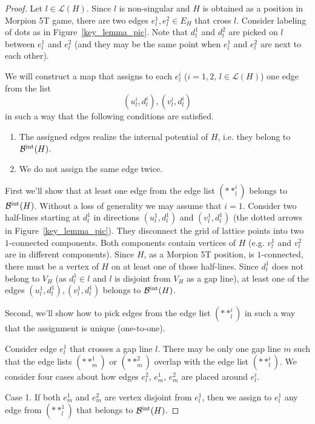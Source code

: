 \begin{proof}
Let $l \in \mathcal{L}(H)$. Since $l$ is non-singular and $H$ is obtained as a position in Morpion 5T game, there are two edges $e^1_l, e^2_l \in E_H$ that cross $l$. 
Consider labeling of dots as in Figure~\ref{key_lemma_pic}. Note that $d^1_l$ and $d^2_l$ are picked on $l$ between $e^1_l$ and $e^2_l$ (and they may be the same point when $e^1_l$ and $e^2_l$ are next to each other).


We will construct a map that assigns to each $e^i_l$ ($i = 1,2$, $l \in \mathcal{L}(H)$) one edge from the list
\[
  (u^i_l, d^i_l), (v^i_l, d^i_l) \tag{$**^i_l$}
\]
in such a way that the following conditions are satisfied.
\begin{enumerate}
\item The assigned edges realize the internal potential of $H$, i.e. they belong to $\mathcal{B}^{\operatorname{int}}(H)$.
\item We do not assign the same edge twice.
\end{enumerate}

First we'll show that at least one edge from the edge list $(**^i_l)$ belongs to $\mathcal{B}^{\operatorname{int}}(H)$.
Without a loss of generality we may assume that $i = 1$.
Consider two half-lines starting at $d^1_l$ in directions $(u^1_l, d^1_l)$ and $(v^1_l, d^1_l)$ (the dotted arrows in Figure~\ref{key_lemma_pic}). 
They disconnect the grid of lattice points into two $1$-connected components. 
Both components contain vertices of $H$ (e.g. $v^1_l$ and $v^{2}_l$ are in different components). 
Since $H$, as a Morpion 5T position, is $1$-connected, 
  there must be a vertex of $H$ on at least 
  one of those half-lines. 
Since $d^1_l$ does not belong to $V_H$ 
  (as $d^1_l \in l$ and $l$ is disjoint from $V_H$ 
  as a gap line), at least one of the 
  edges $(u^1_l, d^1_l), (v^1_l, d^1_l)$ belongs 
  to $\mathcal{B}^{\operatorname{int}}(H)$. 

Second, we'll show how to pick edges from the edge list $(**^i_l)$ in such a way that the assignment is unique (one-to-one).


\vspace{-20pt}
Consider edge $e^1_l$ that crosses a gap line $l$. There may be only one gap line $m$ such that the edge lists $(**^1_m)$ or $(**^2_m)$ overlap with the edge list $(**^i_l)$. We consider four cases about how edges $e^2_l$, $e^1_m$, $e^2_m$ are placed around $e^i_l$.

Case 1. If both $e^1_m$ and $e^2_m$ are vertex disjoint from $e^1_l$, then we assign to $e^1_l$ any edge from $(**^1_l)$ that belongs to $\mathcal{B}^{\operatorname{int}}(H)$.


\end{proof}
